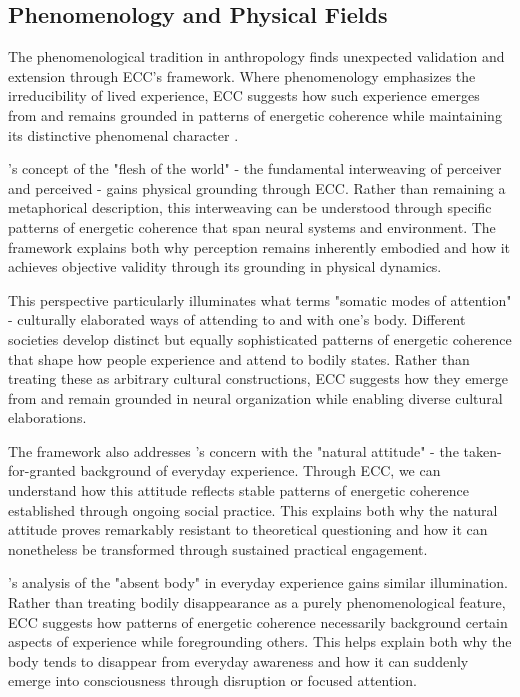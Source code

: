\subsection{Phenomenology and Physical Fields}

The phenomenological tradition in anthropology finds unexpected validation and extension through ECC's framework. Where phenomenology emphasizes the irreducibility of lived experience, ECC suggests how such experience emerges from and remains grounded in patterns of energetic coherence while maintaining its distinctive phenomenal character \cite{merleau1968visible}.

\cite{merleau1968visible}'s concept of the "flesh of the world" - the fundamental interweaving of perceiver and perceived - gains physical grounding through ECC. Rather than remaining a metaphorical description, this interweaving can be understood through specific patterns of energetic coherence that span neural systems and environment. The framework explains both why perception remains inherently embodied and how it achieves objective validity through its grounding in physical dynamics.

This perspective particularly illuminates what \cite{csordas1993somatic} terms "somatic modes of attention" - culturally elaborated ways of attending to and with one's body. Different societies develop distinct but equally sophisticated patterns of energetic coherence that shape how people experience and attend to bodily states. Rather than treating these as arbitrary cultural constructions, ECC suggests how they emerge from and remain grounded in neural organization while enabling diverse cultural elaborations.

The framework also addresses \cite{schutz1945multiple}'s concern with the "natural attitude" - the taken-for-granted background of everyday experience. Through ECC, we can understand how this attitude reflects stable patterns of energetic coherence established through ongoing social practice. This explains both why the natural attitude proves remarkably resistant to theoretical questioning and how it can nonetheless be transformed through sustained practical engagement.

\cite{leder1990absent}'s analysis of the "absent body" in everyday experience gains similar illumination. Rather than treating bodily disappearance as a purely phenomenological feature, ECC suggests how patterns of energetic coherence necessarily background certain aspects of experience while foregrounding others. This helps explain both why the body tends to disappear from everyday awareness and how it can suddenly emerge into consciousness through disruption or focused attention.


